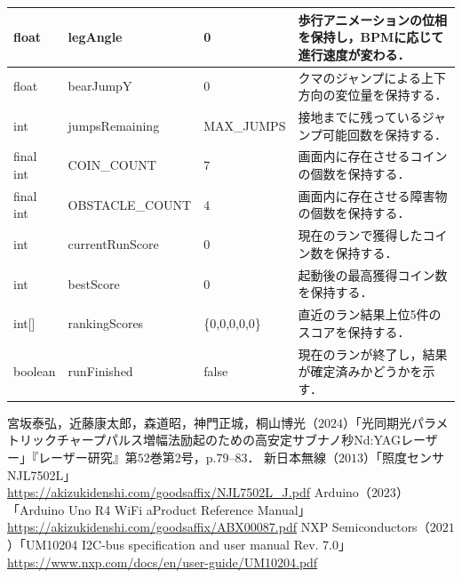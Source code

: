 \documentclass[uplatex,dvipdfmx]{jlreq}
\begin{document}
{\begin{tabularx}{\textwidth}{|M{2.0cm}|M{3.0cm}|M{1.8cm}|Y|}
    float & legAngle & 0 & 歩行アニメーションの位相を保持し，BPMに応じて進行速度が変わる． \\ \hline
    float & bearJumpY & 0 & クマのジャンプによる上下方向の変位量を保持する． \\ \hline
    int & jumpsRemaining & MAX\_JUMPS & 接地までに残っているジャンプ可能回数を保持する． \\ \hline
    final int & COIN\_COUNT & 7 & 画面内に存在させるコインの個数を保持する． \\ \hline
    final int & OBSTACLE\_COUNT & 4 & 画面内に存在させる障害物の個数を保持する． \\ \hline
    int & currentRunScore & 0 & 現在のランで獲得したコイン数を保持する． \\ \hline
    int & bestScore & 0 & 起動後の最高獲得コイン数を保持する． \\ \hline
    int[] & rankingScores & \{0,0,0,0,0\} & 直近のラン結果上位5件のスコアを保持する． \\ \hline
    boolean & runFinished & false & 現在のランが終了し，結果が確定済みかどうかを示す． \\ \hline
\end{tabularx}
}


\begin{thebibliography}{9}
 宮坂泰弘，近藤康太郎，森道昭，神門正城，桐山博光（$2024$）「光同期光パラメトリックチャープパルス増幅法励起のための高安定サブナノ秒Nd:YAGレーザー」『レーザー研究』第$52$巻第$2$号，p.79--83．
新日本無線（$2013$）「照度センサNJL7502L」\\
\url{https://akizukidenshi.com/goodsaffix/NJL7502L_J.pdf}
Arduino（$2023$）「Arduino Uno R4 WiFi aProduct Reference Manual」\\
\url{https://akizukidenshi.com/goodsaffix/ABX00087.pdf}
 NXP Semiconductors（$2021$）「UM10204 I2C-bus specification and user manual Rev. 7.0」\\
\url{https://www.nxp.com/docs/en/user-guide/UM10204.pdf}

\end{thebibliography}
\end{document}
